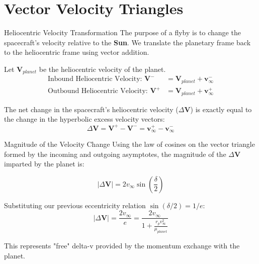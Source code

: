 \documentclass[11pt]{beamer}
\begin{document}
\section{Vector Velocity Triangles}

\begin{frame}{Heliocentric Velocity Transformation}
    The purpose of a flyby is to change the spacecraft's velocity relative to the \textbf{Sun}. We translate the planetary frame back to the heliocentric frame using vector addition.
    
    Let $\bm{V}_{planet}$ be the heliocentric velocity of the planet.
    \begin{align}
        \text{Inbound Heliocentric Velocity: } \bm{V}^- &= \bm{V}_{planet} + \bm{v}_{\infty}^- \\
        \text{Outbound Heliocentric Velocity: } \bm{V}^+ &= \bm{V}_{planet} + \bm{v}_{\infty}^+
    \end{align}
    
    The net change in the spacecraft's heliocentric velocity ($\Delta \bm{V}$) is exactly equal to the change in the hyperbolic excess velocity vectors:
    \begin{equation}
        \Delta \bm{V} = \bm{V}^+ - \bm{V}^- = \bm{v}_{\infty}^+ - \bm{v}_{\infty}^-
    \end{equation}
\end{frame}

\begin{frame}{Magnitude of the Velocity Change}
    Using the law of cosines on the vector triangle formed by the incoming and outgoing asymptotes, the magnitude of the $\Delta \bm{V}$ imparted by the planet is:
    
    \begin{equation}
        |\Delta \bm{V}| = 2 v_\infty \sin\left(\frac{\delta}{2}\right)
    \end{equation}
    
    Substituting our previous eccentricity relation $\sin(\delta/2) = 1/e$:
    \begin{equation}
        |\Delta \bm{V}| = \frac{2 v_\infty}{e} = \frac{2 v_\infty}{1 + \frac{r_p v_\infty^2}{\mu_{planet}}}
    \end{equation}
    
    This represents "free" delta-v provided by the momentum exchange with the planet.
\end{frame}
\end{document}
